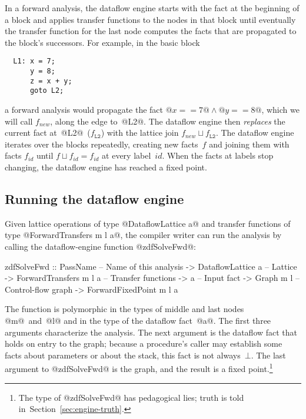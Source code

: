 \documentclass[blockstyle,preprint,natbib,nocopyrightspace]{sigplanconf}
\newcommand\join{\sqcup}
\newcommand{\authornote}[1]{{\em #1}}
\def\authornote#1{\unskip\relax}
\newcommand{\simon}[1]{\authornote{SLPJ: #1}}
\newcommand{\norman}[1]{\authornote{NR: #1}}
\let\remark\norman
\newcommand\secref[1]{Section~\ref{sec:#1}}
\newcommand\seclabel[1]{\label{sec:#1}}
\begin{document}
In a forward analysis, the dataflow engine starts with the fact at the
beginning of a block and applies transfer functions to the nodes in
that block until eventually the transfer function for the last node
computes the facts that are propagated to the block's successors.
For example, in the basic block
\begin{verbatim}
  L1: x = 7;
      y = 8;
      z = x + y;
      goto L2;
\end{verbatim}
a forward analysis would propagate the fact 
$@x == 7@ \land @y == 8@$, which we will call $f_{\mathit{new}}$,
along the edge to~@L2@. 
The dataflow engine then \emph{replaces} the current fact
at~@L2@~($f_{\mathtt{L2}}$) with the lattice join $f_{\mathit{new}}
\join f_{\mathtt{L2}}$. 
The dataflow engine iterates over the blocks repeatedly, creating new
facts~$f$ and joining them with facts $f_{\mathit{id}}$ until
\mbox{$f \join f_{\mathit{id}} = f_{\mathit{id}}$} at every label~$\mathit{id}$.
When the facts at labels stop changing, the dataflow
engine has reached a fixed point.


\ifpagetuning\enlargethispage{0.5\baselineskip}\fi


\subsection{Running the dataflow engine}

\seclabel{zdfSolveFwd}

Given lattice operations of type @DataflowLattice a@
and transfer functions of type @ForwardTransfers m l a@,
the compiler writer can run the analysis by calling the
dataflow-engine function @zdfSolveFwd@:
\simon{Mention somehow that this is one of the main 
functions exposed by the library.}
\begin{code}
 zdfSolveFwd 
  :: PassName               -- Name of this analysis
  -> DataflowLattice a      -- Lattice
  -> ForwardTransfers m l a -- Transfer functions
  -> a                      -- Input fact
  -> Graph m l              -- Control-flow graph
  -> ForwardFixedPoint m l a
\end{code}
The function is polymorphic in the types of middle and last nodes
@m@~and~@l@ and in the type of the dataflow fact~@a@.
The first three arguments characterize the analysis.
The next argument is the dataflow fact that holds on entry to the
graph;
because a procedure's caller may establish some facts about
parameters or about the stack,
this fact
is not always~$\bot$.
The last argument to @zdfSolveFwd@ is the graph, and the result is a 
fixed point.\footnote
{The type of @zdfSolveFwd@ has pedagogical lies;
truth is told in~\secref{engine-truth}.}
\end{document}

